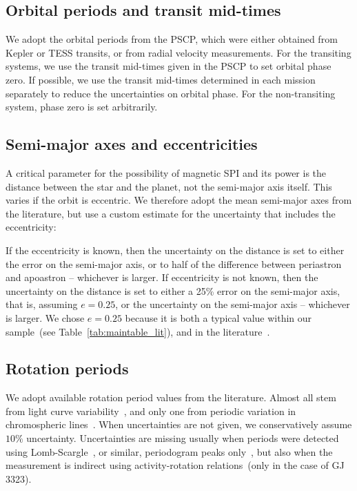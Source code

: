 \documentclass[twocolumn]{aastex631}
\begin{document}
\subsection{Orbital periods and transit mid-times}
\label{sec:data:orbitalperiod}
We adopt the orbital periods from the PSCP, which were either obtained from Kepler or TESS transits, or from radial velocity measurements. For the transiting systems, we use the transit mid-times given in the PSCP to set orbital phase zero. If possible, we use the transit mid-times determined in each mission separately to reduce the uncertainties on orbital phase. For the non-transiting system, phase zero is set arbitrarily.

\subsection{Semi-major axes and eccentricities}
\label{sec:data:a}
A critical parameter for the possibility of magnetic SPI and its power is the distance between the star and the planet, not the semi-major axis itself. This varies if the orbit is eccentric. We therefore adopt the mean semi-major axes from the literature, but use a custom estimate for the uncertainty that includes the eccentricity:

If the eccentricity is known, then the uncertainty on the distance is set to either the error on the semi-major axis, or to half of the difference between periastron and apoastron -- whichever is larger. If eccentricity is not known, then the uncertainty on the distance is set to either a 25\% error on the semi-major axis, that is, assuming $e=0.25$, or the uncertainty on the semi-major axis -- whichever is larger. We chose $e=0.25$ because it is both a typical value within our sample~(see Table~\ref{tab:maintable_lit}), and in the literature~\citep{eylen2019orbital}.

\subsection{Rotation periods}
\label{sec:data:rotationperiods}
We adopt available rotation period values from the literature. Almost all stem from light curve variability~\citep{angus2018inferring, mazeh2015photometric, mcquillan2013stellar, mcquillan2014rotation, luger2017sevenplanet, stock2020carmenes, deleon202137, torres2017validation, stefansson2020habitable, zicher2022one, ment2021toi, rizzuto2020tess, gunther2020stellar}, and only one from periodic variation in chromospheric lines~\citep{demangeon2021warm}. When uncertainties are not given, we conservatively assume $10\%$ uncertainty. Uncertainties are missing usually when periods were detected using Lomb-Scargle~\citep{lomb1976leastsquares, scargle1982studies}, or similar, periodogram peaks only~\citep{gunther2020stellar, kiraga2007agerotationactivity, grankin2013magnetically, burt2014lickcarnegie}, but also when the measurement is indirect using activity-rotation relations~(only in the case of GJ 3323).
\end{document}
